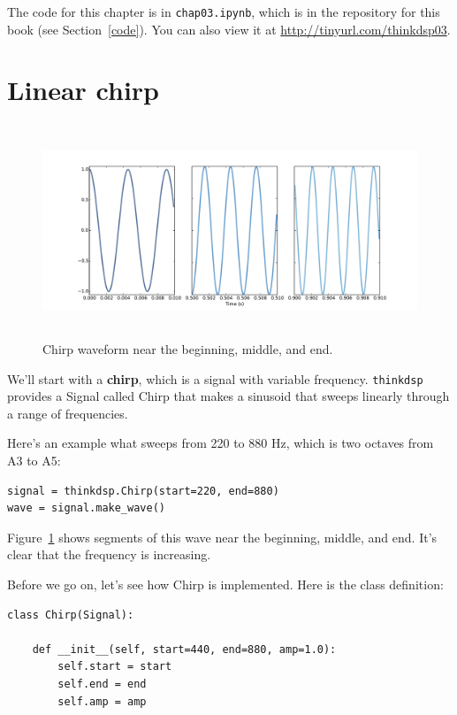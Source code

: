 \documentclass[12pt]{book}
\begin{document}
The code for this chapter is in {\tt chap03.ipynb}, which is in the
repository for this book (see Section~\ref{code}).
You can also view it at \url{http://tinyurl.com/thinkdsp03}.


\section{Linear chirp}

\begin{figure}
\centerline{\includegraphics[height=2.5in]{figs/chirp3.pdf}}
\caption{Chirp waveform near the beginning, middle, and end.}
\label{fig.chirp3}
\end{figure}

We'll start with a {\bf chirp}, which is a signal with variable
frequency.  {\tt thinkdsp} provides a Signal called Chirp that
makes a sinusoid that sweeps linearly through a range of
frequencies.

Here's an example what sweeps from 220 to 880 Hz, which
is two octaves from A3 to A5:

\begin{verbatim}
signal = thinkdsp.Chirp(start=220, end=880)
wave = signal.make_wave()
\end{verbatim}

Figure~\ref{fig.chirp3} shows segments of this wave near the
beginning, middle, and end.  It's clear that the frequency is
increasing.

Before we go on, let's see how Chirp is implemented.  Here
is the class definition:

\begin{verbatim}
class Chirp(Signal):
    
    def __init__(self, start=440, end=880, amp=1.0):
        self.start = start
        self.end = end
        self.amp = amp
\end{verbatim}
\end{document}
